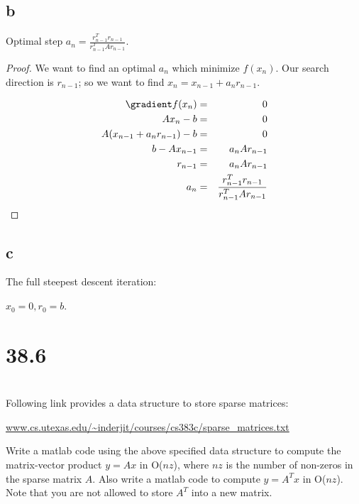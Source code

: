 \documentclass[10pt]{amsart}
\begin{document}
\subsection{b}
\begin{thm}
Optimal step $a_{n} = \frac{r_{n-1}^{T}r_{n-1}}{r_{n-1}^{T}Ar_{n-1}}$.
\end{thm}
\begin{proof}
We want to find an optimal $a_{n}$ which minimize $f(x_{n})$. Our search direction is $r_{n-1}$; so we want to find $x_{n} = x_{n-1} + a_{n}r_{n-1}$.

\begin{eqnarray*}
\gradient f(x_{n}) &=& 0\\
Ax_{n} - b  &=& 0\\
A(x_{n-1} + a_{n}r_{n-1}) - b  &=& 0\\
b - Ax_{n-1}  &=& a_{n}Ar_{n-1}\\
r_{n-1} &=& a_{n}Ar_{n-1}\\
a_{n} &=& \frac{r_{n-1}^{T}r_{n-1}}{r_{n-1}^{T}Ar_{n-1}}\\
\end{eqnarray*}
\end{proof}

\subsection{c}
The full steepest descent iteration:

\begin{algorithm}[H]
$x_{0}=0, r_{0}=b$.\\
\end{algorithm}


\section{38.6}

\tbc

\section{}
Following link provides a data structure to store sparse matrices:

\url{www.cs.utexas.edu/~inderjit/courses/cs383c/sparse_matrices.txt}

Write a matlab code using the above specified data structure to compute the matrix-vector product $y=Ax$ in O($nz$), where $nz$ is the number of non-zeros in the sparse matrix $A$. Also write a matlab code to compute $y=A^Tx$ in O($nz$). Note that you are not allowed to store $A^T$ into a new matrix. 


\tbc


% 
% 
% 
\end{document}
